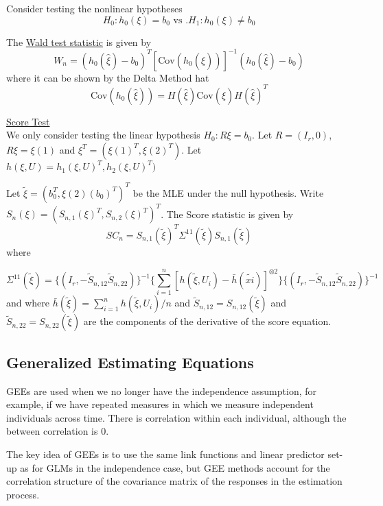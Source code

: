 \documentclass[12pt]{article}
\newcommand{\Cov}{\mathrm{Cov}}
\newcommand{\sumn}{\sum_{i=1}^n}
\numberwithin{equation}{section}
\begin{document}
Consider testing the nonlinear hypotheses
\begin{equation*}
  H_0: h_0(\xi) = b_0 \text{ vs .} H_1: h_0(\xi) \ne b_0
\end{equation*}

The \underline{Wald test statistic} is given by
\begin{equation*}
  W_n = (h_0(\hat{\xi}) - b_0)^T \left[
  \Cov(h_0(\hat{\xi}))
  \right]^{-1}
  (h_0(\hat{\xi}) - b_0)
\end{equation*}
where it can be shown by the Delta Method hat
\begin{equation*}
  \Cov(h_0(\hat{\xi})) = H(\hat{\xi}) \Cov(\hat{\xi}) H(\hat{\xi})^T
\end{equation*}

\underline{Score Test} \\
We only consider testing the linear hypothesis $H_0: R \xi = b_0$. Let $R = (I_r, 0)$, $R \xi = \xi(1)$ and $\xi^T = (\xi(1)^T, \xi(2)^T)$. Let $h(\xi, U) = h_1(\xi, U)^T, h_2(\xi, U)^T)$

Let $\tilde{\xi} = (b_0^T, \xi(2)(b_0)^T)^T$ be the MLE under the null hypothesis. Write $S_n(\xi) = (S_{n, 1}(\xi)^T, S_{n, 2}(\xi)^T)^T$. The Score statistic is given by
\begin{equation*}
  SC_n = S_{n, 1}(\tilde{\xi})^T \Sigma^{11}(\tilde{\xi}) S_{n, 1}(\tilde{\xi})
\end{equation*}
where 

\begin{equation*}
  \Sigma^{11}(\tilde{\xi}) =
    \{ (I_r, -\tilde{S}_{n, 12} \tilde{S}_{n, 22}) \}^{-1}
    \{ \sumn [h(\tilde{\xi}, U_i) - \bar{h}(\tilde{xi})]^{\otimes 2} \}
    \{ (I_r, -\tilde{S}_{n, 12} \tilde{S}_{n, 22}) \}^{-1}
\end{equation*}
and where $\bar{h}(\tilde{\xi}) = \sumn h(\tilde{\xi}, U_i) / n$ and 
$\tilde{S}_{n, 12} = S_{n, 12}(\tilde{\xi})$ and 
$\tilde{S}_{n, 22} = S_{n, 22}(\tilde{\xi})$
are the components of the derivative of the score equation.
%
%
\subsection{Generalized Estimating Equations}
GEEs are used when we no longer have the independence assumption, for example, if we have repeated measures in which we measure independent individuals across time. There is correlation within each individual, although the between correlation is 0.

The key idea of GEEs is to use the same link functions and linear predictor set-up as for GLMs in the independence case, but GEE methods account for the correlation structure of the covariance matrix of the responses in the estimation process.
\end{document}
